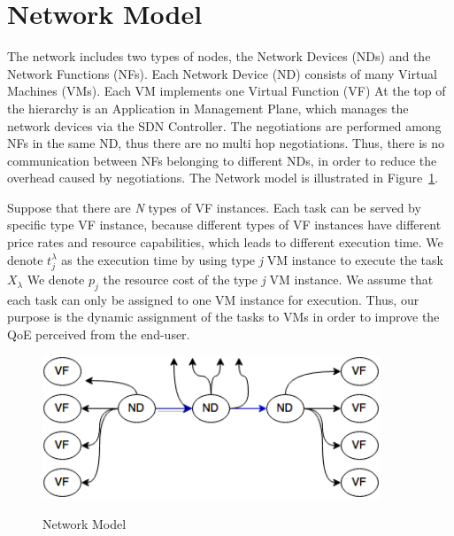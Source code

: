 \documentclass[a4paper]{article}
\begin{document}
\section{Network Model}
The network includes two types of nodes, the Network Devices (NDs) and the Network Functions (NFs). Each Network Device (ND) consists of many Virtual Machines (VMs). Each VM implements one Virtual Function (VF) %
At the top of the hierarchy is an Application in Management Plane, which manages the network devices via the SDN Controller.
The negotiations are performed among NFs in the same ND, thus there are no multi hop negotiations. Thus, there is no communication between NFs belonging to different NDs, in order to reduce the overhead caused by negotiations. The Network model is illustrated in Figure~\ref{fig:networkmodel}.

Suppose that there are \textit{N} types of VF instances. Each task can be served by specific type VF instance, because different types of VF instances have different price rates and resource capabilities, which leads to different execution time. 
We denote  $t^\lambda_j$ as the execution time by using type \textit{j} VM instance to execute the task $X_\lambda$
We denote $p_j$ the resource cost of the type \textit{j} VM instance. 
We assume that each task can only be assigned to one VM instance for execution. Thus, our purpose is the dynamic assignment of the tasks to VMs in order to improve the QoE perceived from the end-user. 


\begin{figure}[!ht]
  \caption{Network Model}
  \centering
    \includegraphics[width=0.9\textwidth]{networkmodel3.png}
    \label{fig:networkmodel}
\end{figure}




\end{document}
